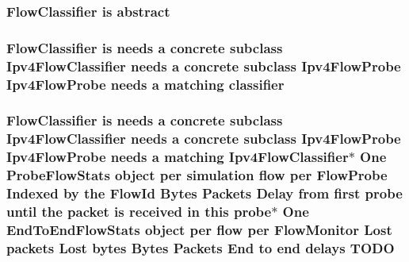\subsubsection[{\texorpdfstring{abstract}{abstract}}]{\setlength{\rightskip}{0pt plus 5cm}Flow\+Classifier is abstract}\hypertarget{design_8txt_af450f1fe0c19a5495b395272ca520ff9}{}\label{design_8txt_af450f1fe0c19a5495b395272ca520ff9}
\subsubsection[{\texorpdfstring{classifier}{classifier}}]{\setlength{\rightskip}{0pt plus 5cm}Flow\+Classifier is needs a concrete subclass Ipv4\+Flow\+Classifier needs a concrete subclass Ipv4\+Flow\+Probe Ipv4\+Flow\+Probe needs a matching classifier}\hypertarget{design_8txt_af9e6b398b148789960232a87c72a107e}{}\label{design_8txt_af9e6b398b148789960232a87c72a107e}
\subsubsection[{\texorpdfstring{T\+O\+DO}{TODO}}]{\setlength{\rightskip}{0pt plus 5cm}Flow\+Classifier is needs a concrete subclass Ipv4\+Flow\+Classifier needs a concrete subclass Ipv4\+Flow\+Probe Ipv4\+Flow\+Probe needs a matching Ipv4\+Flow\+Classifier$\ast$ One Probe\+Flow\+Stats object per simulation flow per Flow\+Probe Indexed by the Flow\+Id Bytes Packets Delay {\bf from} first probe until the packet is received in this probe$\ast$ One End\+To\+End\+Flow\+Stats object per flow per Flow\+Monitor Lost packets Lost bytes Bytes Packets End to end delays T\+O\+DO}\hypertarget{design_8txt_acac571e7916a3fa404f97966c2235936}{}\label{design_8txt_acac571e7916a3fa404f97966c2235936}
